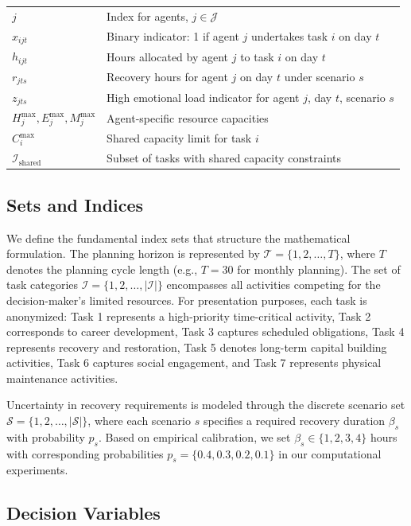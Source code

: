 \documentclass[preprint,review,11pt]{elsarticle}
\begin{document}
\begin{longtable}{ll}
$j$ & Index for agents, $j \in \mathcal{J}$ \\
$x_{ijt}$ & Binary indicator: 1 if agent $j$ undertakes task $i$ on day $t$ \\
$h_{ijt}$ & Hours allocated by agent $j$ to task $i$ on day $t$ \\
$r_{jts}$ & Recovery hours for agent $j$ on day $t$ under scenario $s$ \\
$z_{jts}$ & High emotional load indicator for agent $j$, day $t$, scenario $s$ \\
$H_j^{\max}, E_j^{\max}, M_j^{\max}$ & Agent-specific resource capacities \\
$C_i^{\max}$ & Shared capacity limit for task $i$ \\
$\mathcal{I}_{\text{shared}}$ & Subset of tasks with shared capacity constraints \\
\end{longtable}

\subsection{Sets and Indices}

We define the fundamental index sets that structure the mathematical formulation. The planning horizon is represented by $\mathcal{T} = \{1, 2, \ldots, T\}$, where $T$ denotes the planning cycle length (e.g., $T = 30$ for monthly planning). The set of task categories $\mathcal{I} = \{1, 2, \ldots, |\mathcal{I}|\}$ encompasses all activities competing for the decision-maker's limited resources. For presentation purposes, each task is anonymized: Task 1 represents a high-priority time-critical activity, Task 2 corresponds to career development, Task 3 captures scheduled obligations, Task 4 represents recovery and restoration, Task 5 denotes long-term capital building activities, Task 6 captures social engagement, and Task 7 represents physical maintenance activities.

Uncertainty in recovery requirements is modeled through the discrete scenario set $\mathcal{S} = \{1, 2, \ldots, |\mathcal{S}|\}$, where each scenario $s$ specifies a required recovery duration $\beta_s$ with probability $p_s$. Based on empirical calibration, we set $\beta_s \in \{1, 2, 3, 4\}$ hours with corresponding probabilities $p_s = \{0.4, 0.3, 0.2, 0.1\}$ in our computational experiments.

\subsection{Decision Variables}
\end{document}
